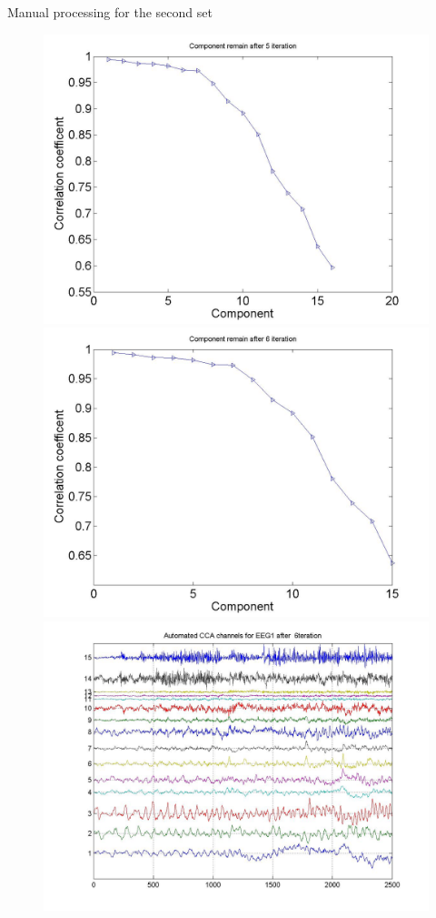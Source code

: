 \documentclass[t,12pt,english
\ifx\beamermode\undefined\else,\beamermode\fi
]{beamer}
\begin{document}
\begin{frame}{Manual processing  for the second set}
\begin{figure}[!htbp]
\includegraphics[width=1\textwidth]{20.jpg}
\endminipage\hfill
{}%
\centering
\includegraphics[width=1\textwidth]{23.jpg}\\
\includegraphics[width=1\textwidth]{24.jpg}
\endminipage\hfill
\end{figure}

 
\end{frame}  
\end{document}
